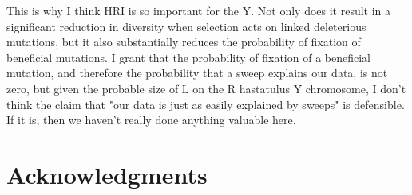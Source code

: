 \documentclass[9pt,twocolumn,twoside]{gsajnl}
\begin{document}
This is why I think HRI is so important for the Y. Not only does it result in a significant reduction in diversity when selection acts on linked deleterious mutations, but it also substantially reduces the probability of fixation of beneficial mutations. I grant that the probability of fixation of a beneficial mutation, and therefore the probability that a sweep explains our data, is not zero, but given the probable size of L on the R hastatulus Y chromosome, I don't think the claim that "our data is just as easily explained by sweeps" is defensible. If it is, then we haven't really done anything valuable here.

\section*{Acknowledgments}


\end{document}
